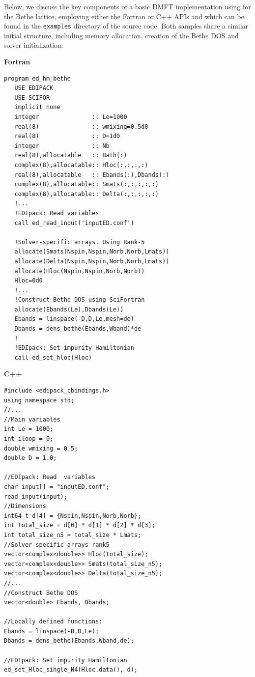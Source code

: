 \documentclass[edipack_sp.tex]{subfiles}
\begin{document}
Below, we discuss the key components of a basic DMFT implementation 
using \NAME for the Bethe lattice, employing either the Fortran or 
C++ APIs and which can be found 
in the {\tt examples} directory of the \NAME source code. Both 
samples share a similar initial structure, including memory 
allocation, creation of the Bethe DOS and solver initialization:
 \begin{center}
\begin{minipage}[t]{0.49\linewidth}
\textbf{Fortran}
\begin{lstlisting}[style=fstyle,frame=none,numbers=none,basicstyle={\scriptsize\ttfamily}]
program ed_hm_bethe
   USE EDIPACK
   USE SCIFOR
   implicit none
   integer               :: Le=1000
   real(8)               :: wmixing=0.5d0
   real(8)               :: D=1d0
   integer               :: Nb
   real(8),allocatable   :: Bath(:)
   complex(8),allocatable:: Hloc(:,:,:,:)
   real(8),allocatable   :: Ebands(:),Dbands(:)
   complex(8),allocatable:: Smats(:,:,:,:,:)
   complex(8),allocatable:: Delta(:,:,:,:,:)
   !...  
   !EDIpack: Read variables
   call ed_read_input('inputED.conf')
   
   !Solver-specific arrays. Using Rank-5  
   allocate(Smats(Nspin,Nspin,Norb,Norb,Lmats))
   allocate(Delta(Nspin,Nspin,Norb,Norb,Lmats))
   allocate(Hloc(Nspin,Nspin,Norb,Norb))
   Hloc=0d0
   !...
   !Construct Bethe DOS using SciFortran
   allocate(Ebands(Le),Dbands(Le))
   Ebands = linspace(-D,D,Le,mesh=de)
   Dbands = dens_bethe(Ebands,Wband)*de
   !
   !EDIpack: Set impurity Hamiltonian
   call ed_set_hloc(Hloc)
\end{lstlisting}
\end{minipage}
%
\begin{minipage}[t]{0.49\linewidth}
\textbf{C++}
\begin{lstlisting}[style=cstyle,frame=none,numbers=none,basicstyle={\scriptsize\ttfamily}]
#include <edipack_cbindings.h>
using namespace std;
//...
//Main variables
int Le = 1000;
int iloop = 0;
double wmixing = 0.5;
double D = 1.0;

//EDIpack: Read  variables    
char input[] = "inputED.conf"; 
read_input(input);      
//Dimensions
int64_t d[4] = {Nspin,Nspin,Norb,Norb};
int total_size = d[0] * d[1] * d[2] * d[3];
int total_size_n5 = total_size * Lmats;    
//Solver-specific arrays rank5
vector<complex<double>> Hloc(total_size);
vector<complex<double>> Smats(total_size_n5);
vector<complex<double>> Delta(total_size_n5);
//...
//Construct Bethe DOS
vector<double> Ebands, Dbands;

//Locally defined functions:
Ebands = linspace(-D,D,Le);
Dbands = dens_bethe(Ebands,Wband,de);

//EDIpack: Set impurity Hamiltonian
ed_set_Hloc_single_N4(Hloc.data(), d);
\end{lstlisting}
\end{minipage}
 \end{center}
\end{document}
